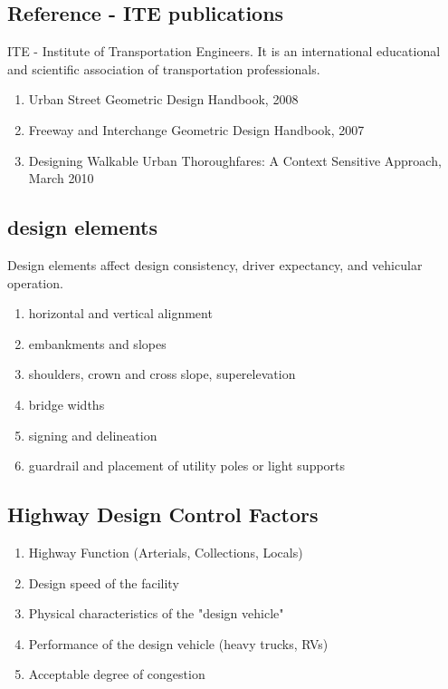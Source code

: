 \documentclass{article}
\begin{document}
  \subsection{Reference - ITE publications}
  ITE - Institute of Transportation Engineers. It is an international educational and scientific association of transportation professionals.\\
  \begin{enumerate}
    \item Urban Street Geometric Design Handbook, 2008
    \item Freeway and Interchange Geometric Design Handbook, 2007
    \item Designing Walkable Urban Thoroughfares: A Context Sensitive Approach, March 2010
  \end{enumerate}

  \subsection{design elements}
  Design elements affect design consistency, driver expectancy, and vehicular operation.
  \begin{enumerate}
    \item horizontal and vertical alignment
    \item embankments and slopes
    \item shoulders, crown and cross slope, superelevation
    \item bridge widths
    \item signing and delineation
    \item guardrail and placement of utility poles or light supports
  \end{enumerate}

  \subsection{Highway Design Control Factors}
  \begin{enumerate}
    \item Highway Function (Arterials, Collections, Locals)
    \item Design speed of the facility
    \item Physical characteristics of the "design vehicle" 
    \item Performance of the design vehicle (heavy trucks, RVs)
    \item Acceptable degree of congestion
  \end{enumerate}
\end{document}
